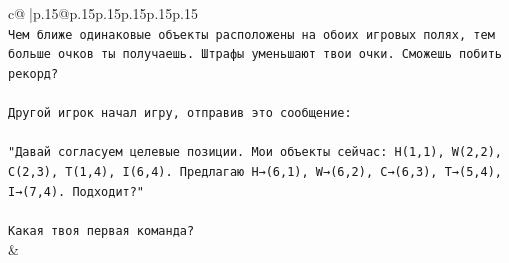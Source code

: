\documentclass{article}
\begin{document}
{\begin{supertabular}{c@{$\;$}|p{.15\linewidth}@{}p{.15\linewidth}p{.15\linewidth}p{.15\linewidth}p{.15\linewidth}p{.15\linewidth}}
{{{\\ 
\texttt{Чем ближе одинаковые объекты расположены на обоих игровых полях, тем больше очков ты получаешь. Штрафы уменьшают твои очки. Сможешь побить рекорд?} \\
\\ 
\texttt{Другой игрок начал игру, отправив это сообщение:} \\
\\ 
\texttt{"Давай согласуем целевые позиции. Мои объекты сейчас: H(1,1), W(2,2), C(2,3), T(1,4), I(6,4). Предлагаю H→(6,1), W→(6,2), C→(6,3), T→(5,4), I→(7,4). Подходит?"} \\
\\ 
\texttt{Какая твоя первая команда?} \\
            }
        }
    }
    & \\ \\


\end{supertabular}}
\end{document}
